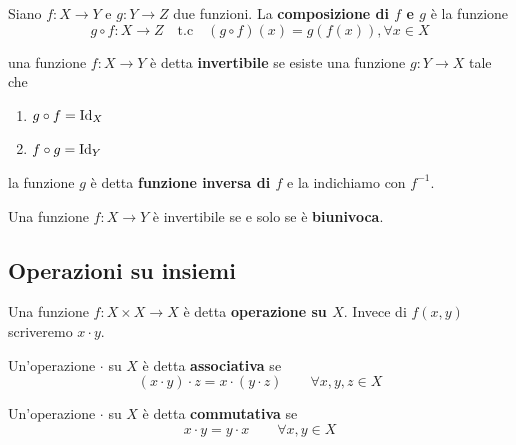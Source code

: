 \documentclass[../main.tex]{subfiles}
\begin{document}
\begin{definition}
    Siano $f: X \rightarrow Y$ e $g: Y \rightarrow Z$ due funzioni. La \textbf{composizione di $f$ e $g$} è la funzione
    \[
        g \circ f : X \rightarrow Z \quad \text{t.c} \quad (g \circ f)(x) = g(f(x)), \forall x \in X
    \]
\end{definition}

\begin{definition}
    una funzione $f: X \rightarrow Y$ è detta \textbf{invertibile} se esiste una funzione $g: Y \rightarrow X$ tale che
    \begin{enumerate}[label=(\roman*)]
        \item $g \circ f = \operatorname{Id}_X$
        \item $f \circ g = \operatorname{Id}_Y$
    \end{enumerate}
    la funzione $g$ è detta \textbf{funzione inversa di $f$} e la indichiamo con $f^{-1}$.
\end{definition}
\begin{remark}
    Una funzione $f: X \rightarrow Y$ è invertibile se e solo se è \textbf{biunivoca}.
\end{remark}

\subsection{Operazioni su insiemi}

\begin{definition}[Operazione]
    Una funzione $f: X \times X \rightarrow X$ è detta \textbf{operazione su $X$}. Invece di $f(x,y)$
    scriveremo $x \cdot y$.
\end{definition}

\begin{definition}
    Un'operazione $\cdot$ su $X$ è detta \textbf{associativa} se
    \[
        \boxed{
            (x \cdot y) \cdot z = x \cdot (y \cdot z) \qquad  \forall x,y,z \in X
        }
    \]
\end{definition}

\begin{definition}
    Un'operazione $\cdot$ su $X$ è detta \textbf{commutativa} se
    \[
        \boxed{
            x \cdot y = y \cdot x \qquad \forall x,y \in X
        }
    \]
\end{definition}
\end{document}
